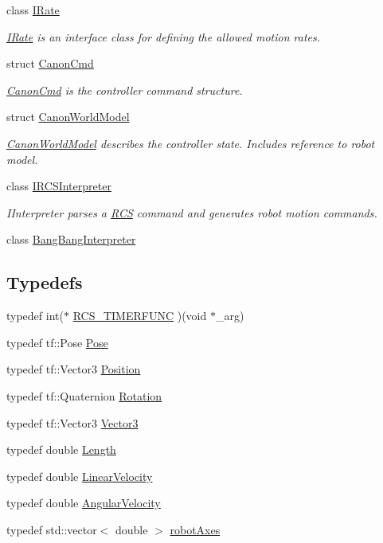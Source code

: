 \begin{DoxyCompactItemize}
class \hyperlink{classRCS_1_1IRate}{I\-Rate}
\begin{DoxyCompactList}\small\item\em \hyperlink{classRCS_1_1IRate}{I\-Rate} is an interface class for defining the allowed motion rates. \end{DoxyCompactList}\item 
struct \hyperlink{structRCS_1_1CanonCmd}{Canon\-Cmd}
\begin{DoxyCompactList}\small\item\em \hyperlink{structRCS_1_1CanonCmd}{Canon\-Cmd} is the controller command structure. \end{DoxyCompactList}\item 
struct \hyperlink{structRCS_1_1CanonWorldModel}{Canon\-World\-Model}
\begin{DoxyCompactList}\small\item\em \hyperlink{structRCS_1_1CanonWorldModel}{Canon\-World\-Model} describes the controller state. Includes reference to robot model. \end{DoxyCompactList}\item 
class \hyperlink{classRCS_1_1IRCSInterpreter}{I\-R\-C\-S\-Interpreter}
\begin{DoxyCompactList}\small\item\em I\-Interpreter parses a \hyperlink{namespaceRCS}{R\-C\-S} command and generates robot motion commands. \end{DoxyCompactList}\item 
class \hyperlink{classRCS_1_1BangBangInterpreter}{Bang\-Bang\-Interpreter}
\end{DoxyCompactItemize}
\subsection*{Typedefs}
\begin{DoxyCompactItemize}
\item 
typedef int($\ast$ \hyperlink{namespaceRCS_ae5dd02ab24956844fae02f10de954ad5}{R\-C\-S\-\_\-\-T\-I\-M\-E\-R\-F\-U\-N\-C} )(void $\ast$\-\_\-arg)
\item 
typedef tf\-::\-Pose \hyperlink{namespaceRCS_aa07e45d8a50e30064283d2b38087f999}{Pose}
\item 
typedef tf\-::\-Vector3 \hyperlink{namespaceRCS_a6080060b617affc23ab1d6309fe7c3cd}{Position}
\item 
typedef tf\-::\-Quaternion \hyperlink{namespaceRCS_a3fd915276fdb632d217c560523c320e0}{Rotation}
\item 
typedef tf\-::\-Vector3 \hyperlink{namespaceRCS_a688a9db9f1e17b76c410c539997d07a7}{Vector3}
\item 
typedef double \hyperlink{namespaceRCS_a86ac9427c1a3f2ec2b94a74888b2cefd}{Length}
\item 
typedef double \hyperlink{namespaceRCS_a20e104cd075c4ca08a073a6261a70a84}{Linear\-Velocity}
\item 
typedef double \hyperlink{namespaceRCS_a3ca212cf7a0c547f5496352e850372a9}{Angular\-Velocity}
\item 
typedef std\-::vector$<$ double $>$ \hyperlink{namespaceRCS_a3185cefb4d61f5c6f364aaf5624a3ee4}{robot\-Axes}
\end{DoxyCompactItemize}
